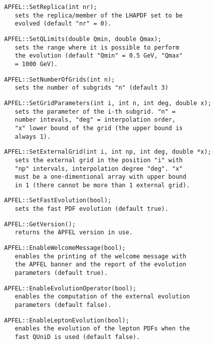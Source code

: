 \documentclass[11pt,a4paper]{article}
\begin{document}
\begin{lstlisting}
  APFEL::SetReplica(int nr);
     sets the replica/member of the LHAPDF set to be
     evolved (default "nr" = 0).
\end{lstlisting}
\begin{lstlisting}
  APFEL::SetQLimits(double Qmin, double Qmax);
     sets the range where it is possible to perform
     the evolution (default "Qmin" = 0.5 GeV, "Qmax"
     = 1000 GeV).
\end{lstlisting}
\begin{lstlisting}
  APFEL::SetNumberOfGrids(int n);
     sets the number of subgrids "n" (default 3)
\end{lstlisting}
\begin{lstlisting}
  APFEL::SetGridParameters(int i, int n, int deg, double x);
     sets the parameter of the i-th subgrid. "n" =
     number intevals, "deg" = interpolation order,
     "x" lower bound of the grid (the upper bound is
     always 1).
\end{lstlisting}
\begin{lstlisting}
  APFEL::SetExternalGrid(int i, int np, int deg, double *x);
     sets the external grid in the position "i" with
     "np" intervals, interpolation degree "deg". "x"
     must be a one-dimentional array with upper bound
     in 1 (there cannot be more than 1 external grid).
\end{lstlisting}
\begin{lstlisting}
  APFEL::SetFastEvolution(bool);
     sets the fast PDF evolution (default true).
\end{lstlisting}
\begin{lstlisting}
  APFEL::GetVersion();
     returns the APFEL version in use.
\end{lstlisting}
\begin{lstlisting}
  APFEL::EnableWelcomeMessage(bool);
     enables the printing of the welcome message with
     the APFEL banner and the report of the evolution
     parameters (default true).
\end{lstlisting}
\begin{lstlisting}
  APFEL::EnableEvolutionOperator(bool);
     enables the computation of the external evolution
     parameters (default false).
\end{lstlisting}
\begin{lstlisting}
  APFEL::EnableLeptonEvolution(bool);
     enables the evolution of the lepton PDFs when the
     fast QUniD is used (default false).
\end{lstlisting}
\end{document}
